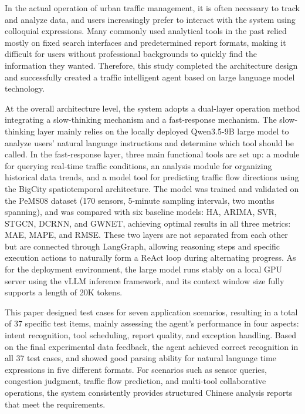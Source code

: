 \begin{eabstract}

In the actual operation of urban traffic management, it is often necessary to track and analyze data, and users increasingly prefer to interact with the system using colloquial expressions. Many commonly used analytical tools in the past relied mostly on fixed search interfaces and predetermined report formats, making it difficult for users without professional backgrounds to quickly find the information they wanted. Therefore, this study completed the architecture design and successfully created a traffic intelligent agent based on large language model technology.

At the overall architecture level, the system adopts a dual-layer operation method integrating a slow-thinking mechanism and a fast-response mechanism. The slow-thinking layer mainly relies on the locally deployed Qwen3.5-9B large model to analyze users' natural language instructions and determine which tool should be called. In the fast-response layer, three main functional tools are set up: a module for querying real-time traffic conditions, an analysis module for organizing historical data trends, and a model tool for predicting traffic flow directions using the BigCity spatiotemporal architecture. The model was trained and validated on the PeMS08 dataset (170 sensors, 5-minute sampling intervals, two months spanning), and was compared with six baseline models: HA, ARIMA, SVR, STGCN, DCRNN, and GWNET, achieving optimal results in all three metrics: MAE, MAPE, and RMSE. These two layers are not separated from each other but are connected through LangGraph, allowing reasoning steps and specific execution actions to naturally form a ReAct loop during alternating progress. As for the deployment environment, the large model runs stably on a local GPU server using the vLLM inference framework, and its context window size fully supports a length of 20K tokens.

This paper designed test cases for seven application scenarios, resulting in a total of 37 specific test items, mainly assessing the agent's performance in four aspects: intent recognition, tool scheduling, report quality, and exception handling. Based on the final experimental data feedback, the agent achieved correct recognition in all 37 test cases, and showed good parsing ability for natural language time expressions in five different formats. For scenarios such as sensor queries, congestion judgment, traffic flow prediction, and multi-tool collaborative operations, the system consistently provides structured Chinese analysis reports that meet the requirements.

\end{eabstract}
